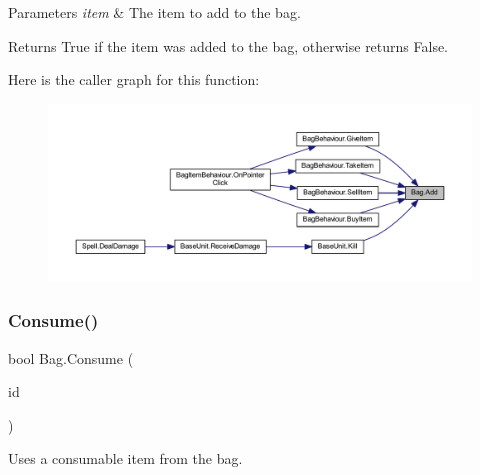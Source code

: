 \begin{DoxyParams}{Parameters}
{\em item} & The item to add to the bag.\\
\hline
\end{DoxyParams}
\begin{DoxyReturn}{Returns}
True if the item was added to the bag, otherwise returns False.
\end{DoxyReturn}
Here is the caller graph for this function\+:
\nopagebreak
\begin{figure}[H]
\begin{center}
\leavevmode
\includegraphics[width=350pt]{class_bag_a4efd17483fce361ea8a01dcda349b3b4_icgraph}
\end{center}
\end{figure}
\mbox{\label{class_bag_a85aa679243be4a24a6278d5f68c2ed5e}} 
\subsubsection{\texorpdfstring{Consume()}{Consume()}}
{\footnotesize\ttfamily bool Bag.\+Consume (\begin{DoxyParamCaption}\item[{\mbox{\hyperlink{class_base_item_add9920d2f5a4fa91752714a8f3ab424b}{Base\+Item.\+ID}}}]{id }\end{DoxyParamCaption})}



Uses a consumable item from the bag. 


